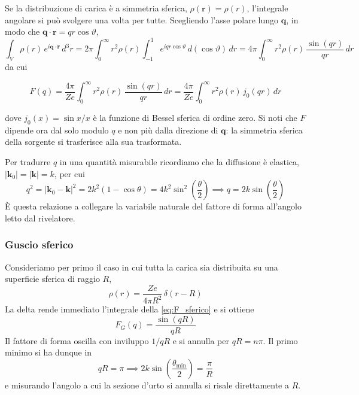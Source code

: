 Se la distribuzione di carica è a simmetria sferica, $\rho(\mathbf{r}) = \rho(r)$, l'integrale angolare si può svolgere una volta per tutte. Scegliendo l'asse polare lungo $\mathbf{q}$, in modo che $\mathbf{q}\cdot\mathbf{r} = qr\cos\vartheta$,
\begin{equation*}
    \int_V \rho(r)\,e^{i\mathbf{q}\cdot\mathbf{r}}\,d^3r = 2\pi\int_0^{\infty} r^2\rho(r)\int_{-1}^{1} e^{iqr\cos\vartheta}\,d(\cos\vartheta)\,dr = 4\pi\int_0^{\infty} r^2\rho(r)\,\frac{\sin(qr)}{qr}\,dr
\end{equation*}
da cui
\begin{tcolorbox}[colback=black!5!white, colframe=black!45!white, boxrule=0.8pt]
\begin{equation}
    F(q) = \frac{4\pi}{Ze}\int_0^{\infty} r^2\rho(r)\,\frac{\sin(qr)}{qr}\,dr = \frac{4\pi}{Ze}\int_0^{\infty} r^2\rho(r)\,j_0(qr)\,dr
    \label{eq:F_sferico}
\end{equation}
\end{tcolorbox}
dove $j_0(x) = \sin x / x$ è la funzione di Bessel sferica di ordine zero. Si noti che $F$ dipende ora dal solo modulo $q$ e non più dalla direzione di $\mathbf{q}$: la simmetria sferica della sorgente si trasferisce alla sua trasformata.

Per tradurre $q$ in una quantità misurabile ricordiamo che la diffusione è elastica, $|\mathbf{k}_0| = |\mathbf{k}| = k$, per cui
\begin{equation}
    q^2 = \left|\mathbf{k}_0-\mathbf{k}\right|^2 = 2k^2(1-\cos\theta) = 4k^2\sin^2\!\left(\frac{\theta}{2}\right) \implies q = 2k\sin\!\left(\frac{\theta}{2}\right)
    \label{eq:q_theta}
\end{equation}
È questa relazione a collegare la variabile naturale del fattore di forma all'angolo letto dal rivelatore.


\subsubsection*{Guscio sferico}

Consideriamo per primo il caso in cui tutta la carica sia distribuita su una superficie sferica di raggio $R$,
\begin{equation*}
    \rho(r) = \frac{Ze}{4\pi R^2}\,\delta(r-R)
\end{equation*}
La delta rende immediato l'integrale della \eqref{eq:F_sferico} e si ottiene
\begin{equation}
    F_G(q) = \frac{\sin(qR)}{qR}
    \label{eq:F_guscio}
\end{equation}
Il fattore di forma oscilla con inviluppo $1/qR$ e si annulla per $qR = n\pi$. Il primo minimo si ha dunque in
\begin{equation}
    qR = \pi \implies 2k\sin\!\left(\frac{\theta_{\min}}{2}\right) = \frac{\pi}{R}
    \label{eq:minimo_guscio}
\end{equation}
e misurando l'angolo a cui la sezione d'urto si annulla si risale direttamente a $R$.

